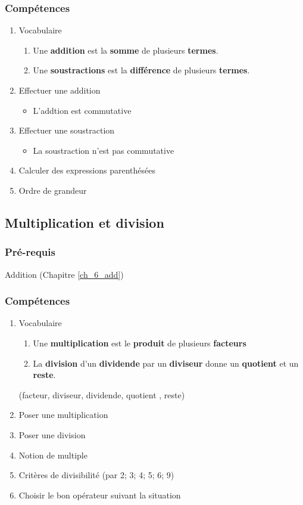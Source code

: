 \subsubsection*{Compétences}

\begin{enumerate}
	\item Vocabulaire 
	\begin{enumerate}
		\item Une \textbf{addition} est la \textbf{somme} de plusieurs \textbf{termes}.
		\item Une \textbf{soustractions} est la \textbf{différence} de plusieurs \textbf{termes}.
	\end{enumerate}
	\item Effectuer une addition
	\begin{itemize}
		\item L'addtion est commutative
	\end{itemize}
	\item Effectuer une soustraction
	\begin{itemize}
		\item La soustraction n'est pas commutative
	\end{itemize}
	\item Calculer des expressions parenthésées 
	\item Ordre de grandeur
\end{enumerate}


\subsection{Multiplication et division}\label{ch_6_multi}

\subsubsection*{Pré-requis}

Addition (Chapitre \ref{ch_6_add})

\subsubsection*{Compétences}
\begin{enumerate}
	\item Vocabulaire 
	\begin{enumerate}
		\item Une \textbf{multiplication} est le \textbf{produit} de plusieurs \textbf{facteurs}
		\item La \textbf{division} d'un \textbf{dividende} par un \textbf{diviseur} donne un \textbf{quotient} et un \textbf{reste}.
		
	\end{enumerate}	(facteur, diviseur, dividende, quotient , reste)
	\item Poser une multiplication
	\item Poser une division
	\item Notion de multiple
	\item Critères de divisibilité (par 2; 3; 4; 5; 6; 9)
	\item Choisir le bon opérateur suivant la situation
\end{enumerate}


